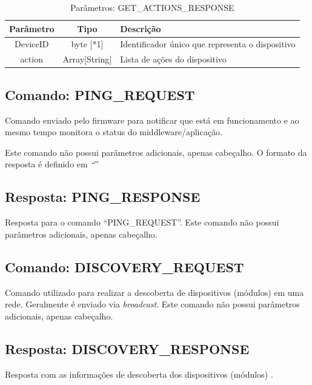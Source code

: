 \begin{table}[H]
\begin{centering}
\begin{tabular}{|c|c|l|}
\hline 
Parâmetro & Tipo & Descrição\tabularnewline
\hline 
\hline 
DeviceID & byte {[}{*}1{]} & Identificador único que representa o dispositivo\tabularnewline
\hline 
action & Array{[}String{]} & Lista de ações do dispositivo\tabularnewline
\hline 
\end{tabular}
\par\end{centering}
\caption{Parâmetros: GET\_ACTIONS\_RESPONSE}
\end{table}


\subsection{Comando: PING\_REQUEST\label{subsec:PING_REQUEST}}

Comando enviado pelo firmware para notificar que está em funcionamento
e ao mesmo tempo monitora o status do middleware/aplicação. 

Este comando não possui parâmetros adicionais, apenas cabeçalho. O
formato da resposta é definido em \emph{``}''

\subsection{Resposta: PING\_RESPONSE\label{subsec:PING_RESPONSE}}

Resposta para o comando ``PING\_REQUEST''. Este comando não possui
parâmetros adicionais, apenas cabeçalho.

\subsection{Comando: DISCOVERY\_REQUEST\label{subsec:DISCOVERY_REQUEST}}

Comando utilizado para realizar a descoberta de dispositivos (módulos)
em uma rede. Geralmente é enviado via \emph{broadcast}. Este comando
não possui parâmetros adicionais, apenas cabeçalho.

\subsection{Resposta: DISCOVERY\_RESPONSE\label{subsec:DISCOVERY_RESPONSE}}

Resposta com as informações de descoberta dos dispositivos (módulos)
. 

